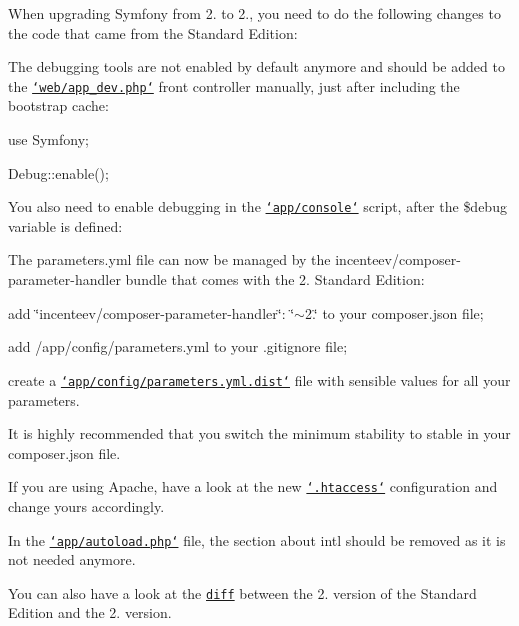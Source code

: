 When upgrading Symfony from 2. to 2., you need to do the following changes to the code that came from the Standard Edition\+:


\begin{DoxyItemize}
\item The debugging tools are not enabled by default anymore and should be added to the \href{https://github.com/symfony/symfony-standard/blob/2.3/web/app_dev.php}{\tt `web/app\+\_\+dev.php`} front controller manually, just after including the bootstrap cache\+: \begin{DoxyVerb} use Symfony\Component\Debug\Debug;

 Debug::enable();
\end{DoxyVerb}


You also need to enable debugging in the \href{https://github.com/symfony/symfony-standard/blob/2.3/app/console}{\tt `app/console`} script, after the {\ttfamily \$debug} variable is defined\+: 

\item The {\ttfamily parameters.\+yml} file can now be managed by the {\ttfamily incenteev/composer-\/parameter-\/handler} bundle that comes with the 2. Standard Edition\+:
\begin{DoxyItemize}
\item add {\ttfamily \char`\"{}incenteev/composer-\/parameter-\/handler\char`\"{}\+: \char`\"{}$\sim$2.\char`\"{}} to your {\ttfamily composer.\+json} file;
\item add {\ttfamily /app/config/parameters.yml} to your {\ttfamily .gitignore} file;
\item create a \href{https://github.com/symfony/symfony-standard/blob/2.3/app/config/parameters.yml.dist}{\tt `app/config/parameters.yml.\+dist`} file with sensible values for all your parameters.
\end{DoxyItemize}
\item It is highly recommended that you switch the minimum stability to {\ttfamily stable} in your {\ttfamily composer.\+json} file.
\item If you are using Apache, have a look at the new \href{https://github.com/symfony/symfony-standard/blob/2.3/web/.htaccess}{\tt `.htaccess`} configuration and change yours accordingly.
\item In the \href{https://github.com/symfony/symfony-standard/blob/2.3/app/autoload.php}{\tt `app/autoload.php`} file, the section about {\ttfamily intl} should be removed as it is not needed anymore.
\end{DoxyItemize}

You can also have a look at the \href{https://github.com/symfony/symfony-standard/compare/v2.2.0%E2%80%A62.3}{\tt diff} between the 2. version of the Standard Edition and the 2. version. 